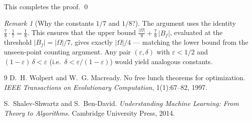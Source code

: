 \documentclass[11pt]{article}
\theoremstyle{remark}
\newtheorem*{remark}{Remark}
\newcommand{\card}[1]{|#1|}
\begin{document}
This completes the proof. \qed

\begin{remark}[Why the constants $1/7$ and $1/8$?]
The argument uses the identity $\frac{7}{8} \cdot \frac{1}{7} =
\frac{1}{8}$.  This ensures that the upper bound
$\frac{\card{\Omega}}{8} + \frac{7}{8}\,\card{B_f}$, evaluated at the
threshold $\card{B_f} = \card{\Omega}/7$, gives exactly $\card{\Omega}/4$
--- matching the lower bound from the unseen-point counting argument.
Any pair $(\varepsilon, \delta)$ with $\varepsilon < 1/2$ and
$(1 - \varepsilon)\,\delta < \varepsilon$ (i.e.\ $\delta < \varepsilon /
(1 - \varepsilon)$) would yield analogous constants.
\end{remark}

\medskip
\begin{thebibliography}{9}
D.~H. Wolpert and W.~G. Macready.
\newblock No free lunch theorems for optimization.
\newblock \emph{IEEE Transactions on Evolutionary Computation}, 1(1):67--82,
  1997.

S.~Shalev-Shwartz and S.~Ben-David.
\newblock \emph{Understanding Machine Learning: From Theory to Algorithms}.
\newblock Cambridge University Press, 2014.
\end{thebibliography}
\end{document}
